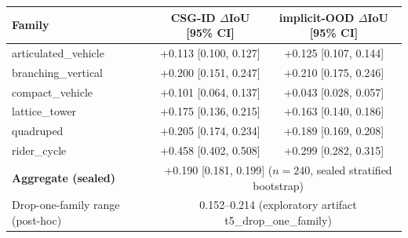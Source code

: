 \begin{tabular}{lcc}
\toprule
Family & CSG-ID $\Delta$IoU [95\% CI] & implicit-OOD $\Delta$IoU [95\% CI] \\
\midrule
articulated\_vehicle & +0.113 [0.100, 0.127] & +0.125 [0.107, 0.144] \\
branching\_vertical & +0.200 [0.151, 0.247] & +0.210 [0.175, 0.246] \\
compact\_vehicle & +0.101 [0.064, 0.137] & +0.043 [0.028, 0.057] \\
lattice\_tower & +0.175 [0.136, 0.215] & +0.163 [0.140, 0.186] \\
quadruped & +0.205 [0.174, 0.234] & +0.189 [0.169, 0.208] \\
rider\_cycle & +0.458 [0.402, 0.508] & +0.299 [0.282, 0.315] \\
\midrule
\textbf{Aggregate (sealed)} & \multicolumn{2}{c}{+0.190 [0.181, 0.199] \; ($n{}={}240$, sealed stratified bootstrap)} \\
Drop-one-family range (post-hoc) & \multicolumn{2}{c}{0.152--0.214 \; (exploratory artifact t5\_drop\_one\_family)} \\
\bottomrule
\end{tabular}

